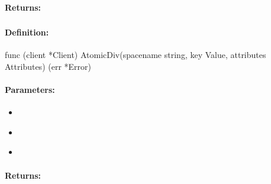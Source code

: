 \paragraph{Returns:}


\pagebreak
\subsubsection{}
\label{api:Go:AtomicDiv}


\paragraph{Definition:}
\begin{gocode}
func (client *Client) AtomicDiv(spacename string, key Value, attributes Attributes) (err *Error)
\end{gocode}

\paragraph{Parameters:}
\begin{itemize}[noitemsep]
\item {}\\

\item {}\\

\item {}\\

\end{itemize}

\paragraph{Returns:}


\pagebreak
\subsubsection{}
\label{api:Go:UxactAtomicDiv}


